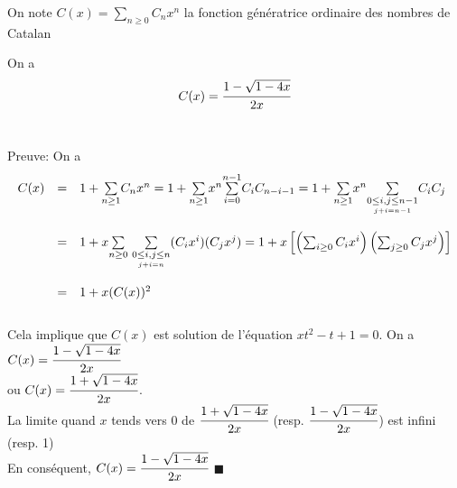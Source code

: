 On note $C(x)=\underset{n\geq 0}{\sum}C_{n}x^{n}$ la fonction génératrice ordinaire des nombres de Catalan
\begin{proposition}
	\begin{rm}
		On a \[C(x)=\cfrac{1-
				\sqrt{1-4x}}{2x}\]\\
	\end{rm}
\end{proposition}
Preuve: On a\\\[
	\begin{array}{r r l}
		C(x) & =       & 1+\underset{n\geq1}{\sum}C_{n}x^n = 1+ \underset{n\geq1}{\sum}x^{n}\underset{i=0}{\overset{n-1}{\sum}}C_{i}C_{n-i-1} = 1+
		\underset{n\geq1}{\sum}x^n\underset{\underset{j+i=n-1}{0\leq i, j \leq n-1}}{\sum}C_{i}C_{j}                                               \\
		     & \text{} &                                                                                                                           \\
		     & =       & 1+x\underset{n\geq0}{\sum}\text{ }\underset{\underset{j+i=n}{0\leq i, j \leq n}}{\sum}(C_{i}x^i)(C_{j}x^j)
		= 1 +x\left[\left(\sum_{i\geq0}C_{i}x^i\right)\left(\sum_{j\geq0}C_{j}x^j\right)\right]                                                    \\
		     & \text{} &                                                                                                                           \\
		     & =       & 1+x(C(x))^2
	\end{array}
\]\\
Cela implique que $C(x)$ est solution de l'équation $xt^2-t+1 = 0$. On a $C(x)=\cfrac{1-\sqrt{1-4x}}{2x}$\\ ou $C(x)=\cfrac{1+\sqrt{1-4x}}{2x}$.\\
La limite quand $x$ tends vers $0$ de $\cfrac{1+\sqrt{1-4x}}{2x}$ (resp. $\cfrac{1-\sqrt{1-4x}}{2x}$) est infini (resp. 1) \\
En conséquent, $C(x)=\cfrac{1-\sqrt{1-4x}}{2x}$ \hspace{5pt}$\blacksquare$

